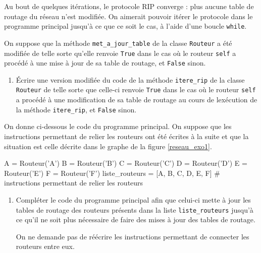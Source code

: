 Au bout de quelques itérations, le protocole RIP converge : plus aucune table de routage du réseau n’est modifiée. On aimerait pouvoir itérer le protocole dans le programme principal jusqu’à ce que ce soit le cas, à l’aide d’une boucle \verb|while|.\par

On suppose que la méthode \verb|met_a_jour_table| de la classe \verb|Routeur| a été modifiée de telle sorte qu’elle renvoie \verb|True| dans le cas où le routeur \verb|self| a procédé à une mise à jour de sa table de routage, et \verb|False| sinon.


\begin{enumerate}[series=monDS, resume]
    \item Écrire une version modifiée du code de la méthode \verb|itere_rip| de la classe \verb|Routeur| de telle sorte que celle-ci renvoie \verb|True| dans le cas où le routeur \verb|self| a procédé à une modification de sa table de routage au cours de lexécution de la méthode \verb|itere_rip|, et \verb|False| sinon.

\end{enumerate}

On donne ci-dessous le code du programme principal. On suppose que les instructions permettant de relier les routeurs ont été écrites à la suite et que la situation est celle décrite dans le graphe de la figure \ref{reseau_exo1}.

    \begin{CodePythontexAlt}[TaillePolice=\large, Largeur=1\linewidth,Centre,Lignes=true,PremLigne=1]{}
A = Routeur('A') 
B = Routeur('B') 
C = Routeur('C') 
D = Routeur('D') 
E = Routeur('E') 
F = Routeur('F') 
liste_routeurs = [A, B, C, D, E, F]
# instructions permettant de relier les routeurs
\end{CodePythontexAlt}

\begin{enumerate}[series=monDS, resume]
    \item Compléter le code du programme principal afin que celui-ci mette à jour les tables de routage des routeurs présents dans la liste \verb|liste_routeurs| jusqu’à ce qu’il ne soit plus nécessaire de faire des mises à jour des tables de routage.

    On ne demande pas de réécrire les instructions permettant de connecter les routeurs entre eux.

\end{enumerate}
